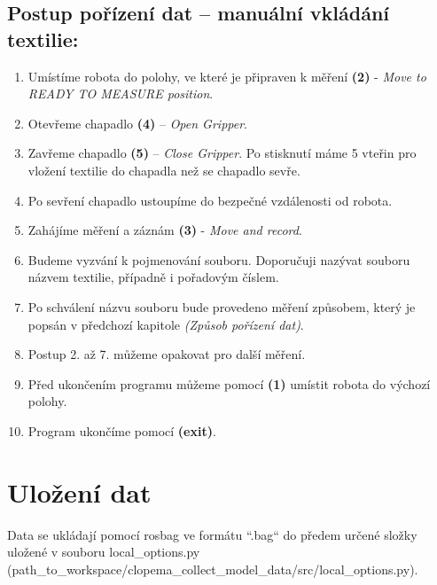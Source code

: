 \documentclass[10pt,a4paper,titlepage,oneside]{book}
\begin{document}
\subsection*{Postup pořízení dat – manuální vkládání textilie:}
\begin{enumerate}
  \item Umístíme robota do polohy, ve které je připraven k měření \textbf{(2)} - \textit{Move to READY TO MEASURE position}.
  \item Otevřeme chapadlo \textbf{(4)} – \textit{Open Gripper}.
  \item Zavřeme chapadlo \textbf{(5)} – \textit{Close Gripper}. Po stisknutí máme 5 vteřin pro vložení textilie do chapadla než se chapadlo sevře.
  \item Po sevření chapadlo ustoupíme do bezpečné vzdálenosti od robota.
  \item Zahájíme měření a záznám \textbf{(3)} - \textit{Move and record}.
  \item Budeme vyzvání k pojmenování souboru. Doporučuji nazývat souboru názvem textilie, případně i pořadovým číslem.
  \item Po schválení názvu souboru bude provedeno měření způsobem, který je popsán v předchozí kapitole \textit{(Způsob pořízení dat)}.
  \item Postup 2. až 7. můžeme opakovat pro další měření.
  \item Před ukončením programu můžeme pomocí \textbf{(1)} umístit robota do výchozí polohy.
  \item Program ukončíme pomocí \textbf{(exit)}.
\end{enumerate}

\section*{Uložení dat}
Data se ukládají pomocí rosbag ve formátu “.bag“ do předem určené složky uložené v souboru local\_options.py (path\_to\_workspace/clopema\_collect\_model\_data/src/local\_options.py).\\
\\
\end{document}
